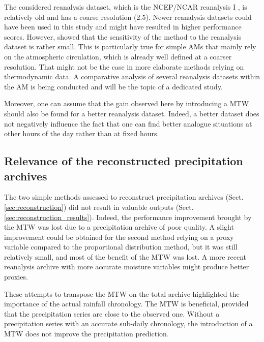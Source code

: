 \documentclass[hess, manuscript]{copernicus}
\begin{document}
	The considered reanalysis dataset, which is the NCEP/NCAR reanalysis I \citep{Kalnay1996}, is relatively old and has a coarse resolution (2.5\degree). Newer reanalysis datasets could have been used in this study and might have resulted in higher performance scores. However, \cite{BenDaoud2009} showed that the sensitivity of the method to the reanalysis dataset is rather small. This is particularly true for simple AMs that mainly rely on the atmospheric circulation, which is already well defined at a coarser resolution. That might not be the case in more elaborate methods relying on thermodynamic data. A comparative analysis of several reanalysis datasets within the AM is being conducted and will be the topic of a dedicated study.
	
	Moreover, one can assume that the gain observed here by introducing a MTW should also be found for a better reanalysis dataset. Indeed, a better dataset does not negatively influence the fact that one can find better analogue situations at other hours of the day rather than at fixed hours.
	
	
	\subsection{Relevance of the reconstructed precipitation archives}
	
	The two simple methods assessed to reconstruct precipitation archives (Sect. \ref{sec:reconstruction}) did not result in valuable outputs (Sect. \ref{sec:reconstruction_results}). Indeed, the performance improvement brought by the MTW was lost due to a precipitation archive of poor quality. A slight improvement could be obtained for the second method relying on a proxy variable compared to the proportional distribution method, but it was still relatively small, and most of the benefit of the MTW was lost. A more recent reanalysis archive with more accurate moisture variables might produce better proxies.
	
	These attempts to transpose the MTW on the total archive highlighted the importance of the actual rainfall chronology. The MTW is beneficial, provided that the precipitation series are close to the observed one. Without a precipitation series with an accurate sub-daily chronology, the introduction of a MTW does not improve the precipitation prediction.
	
	
	
	\conclusions  %
	\label{sec:conclusions}
	
\end{document}
